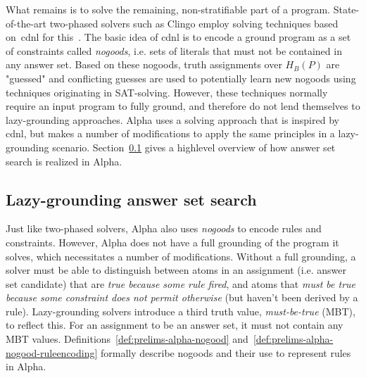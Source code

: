 What remains is to solve the remaining, non-stratifiable part of a program. State-of-the-art two-phased solvers such as Clingo employ solving techniques based on~\gls{cdnl} for this~\cite{clasp-cdnl}. The basic idea of \gls{cdnl} is to encode a ground program as a set of constraints called \emph{nogoods}, i.e. sets of literals that must not be contained in any answer set. Based on these nogoods, truth assignments over $H_B(P)$ are "guessed" and conflicting guesses are used to potentially learn new nogoods using techniques originating in SAT-solving. However, these techniques normally require an input program to fully ground, and therefore do not lend themselves to lazy-grounding approaches. Alpha uses a solving approach that is inspired by \gls{cdnl}, but makes a number of modifications to apply the same principles in a lazy-grounding scenario. Section~\ref{subsec:prelims-lazygrounding-alpha-cdnl} gives a highlevel overview of how answer set search is realized in Alpha.

\subsection{Lazy-grounding answer set search}
\label{subsec:prelims-lazygrounding-alpha-cdnl}

Just like two-phased solvers, Alpha also uses \emph{nogoods} to encode rules and constraints. However, Alpha does not have a full grounding of the program it solves, which necessitates a number of modifications. Without a full grounding, a solver must be able to distinguish between atoms in an assignment (i.e. answer set candidate) that are \emph{true because some rule fired}, and atoms that \emph{must be true because some constraint does not permit otherwise} (but haven't been derived by a rule). Lazy-grounding solvers introduce a third truth value, \emph{must-be-true} (MBT), to reflect this. For an assignment to be an answer set, it must not contain any MBT values. Definitions~\ref{def:prelims-alpha-nogood} and~\ref{def:prelims-alpha-nogood-ruleencoding} formally describe nogoods and their use to represent rules in Alpha.

